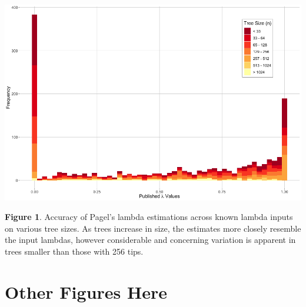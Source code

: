 \documentclass[]{article}
\begin{document}
\includegraphics[width=0.95\linewidth]{Fig1}

\singlespacing \textbf{Figure 1}. Accuracy of Pagel's lambda estimations
across known lambda inputs on various tree sizes. As trees increase in
size, the estimates more closely resemble the input lambdas, however
considerable and concerning variation is apparent in trees smaller than
those with 256 tips. \hfill\break

\newpage

\section{Other Figures Here}\label{other-figures-here}
\end{document}
